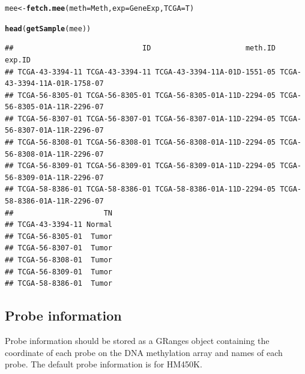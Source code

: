 \documentclass{article}\usepackage[]{graphicx}\usepackage[usenames,dvipsnames]{color}
\makeatletter
\newcommand{\hlstd}[1]{\textcolor[rgb]{0.345,0.345,0.345}{#1}}%
\newcommand{\hlkwb}[1]{\textcolor[rgb]{0.69,0.353,0.396}{#1}}%
\newcommand{\hlkwc}[1]{\textcolor[rgb]{0.333,0.667,0.333}{#1}}%
\newcommand{\hlkwd}[1]{\textcolor[rgb]{0.737,0.353,0.396}{\textbf{#1}}}%
\newenvironment{kframe}{%
 \def\at@end@of@kframe{}%
 \ifinner\ifhmode%
  \def\at@end@of@kframe{\end{minipage}}%
  \begin{minipage}{\columnwidth}%
 \fi\fi%
 \def\FrameCommand##1{\hskip\@totalleftmargin \hskip-\fboxsep
 \colorbox{shadecolor}{##1}\hskip-\fboxsep
     \hskip-\linewidth \hskip-\@totalleftmargin \hskip\columnwidth}%
 \MakeFramed {\advance\hsize-\width
   \@totalleftmargin\z@ \linewidth\hsize
   \@setminipage}}%
 {\par\unskip\endMakeFramed%
 \at@end@of@kframe}
\newenvironment{knitrout}{}{} %
\makeatother
\begin{document}
\begin{knitrout}
\color{fgcolor}\begin{kframe}
\begin{alltt}
\hlstd{mee} \hlkwb{<-} \hlkwd{fetch.mee}\hlstd{(}\hlkwc{meth}\hlstd{=Meth,} \hlkwc{exp}\hlstd{=GeneExp,} \hlkwc{TCGA}\hlstd{=T)}
\end{alltt}


{\ttfamily\noindent\itshape{}}\begin{alltt}
\hlkwd{head}\hlstd{(}\hlkwd{getSample}\hlstd{(mee))}
\end{alltt}
\begin{verbatim}
##                              ID                      meth.ID                       exp.ID
## TCGA-43-3394-11 TCGA-43-3394-11 TCGA-43-3394-11A-01D-1551-05 TCGA-43-3394-11A-01R-1758-07
## TCGA-56-8305-01 TCGA-56-8305-01 TCGA-56-8305-01A-11D-2294-05 TCGA-56-8305-01A-11R-2296-07
## TCGA-56-8307-01 TCGA-56-8307-01 TCGA-56-8307-01A-11D-2294-05 TCGA-56-8307-01A-11R-2296-07
## TCGA-56-8308-01 TCGA-56-8308-01 TCGA-56-8308-01A-11D-2294-05 TCGA-56-8308-01A-11R-2296-07
## TCGA-56-8309-01 TCGA-56-8309-01 TCGA-56-8309-01A-11D-2294-05 TCGA-56-8309-01A-11R-2296-07
## TCGA-58-8386-01 TCGA-58-8386-01 TCGA-58-8386-01A-11D-2294-05 TCGA-58-8386-01A-11R-2296-07
##                     TN
## TCGA-43-3394-11 Normal
## TCGA-56-8305-01  Tumor
## TCGA-56-8307-01  Tumor
## TCGA-56-8308-01  Tumor
## TCGA-56-8309-01  Tumor
## TCGA-58-8386-01  Tumor
\end{verbatim}
\end{kframe}
\end{knitrout}

\subsection{Probe information}
Probe information should be stored as a GRanges object containing the coordinate 
of each probe on the DNA methylation array and names of each probe. 
The default probe information is for HM450K. 
\end{document}
